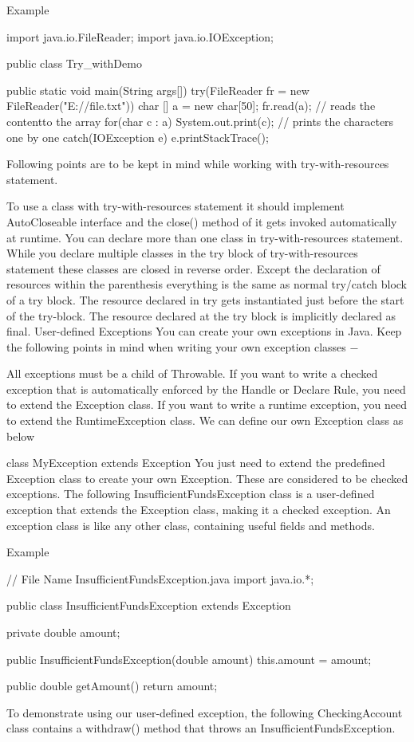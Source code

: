 Example

import java.io.FileReader;
import java.io.IOException;

public class Try_withDemo {

   public static void main(String args[]) {
      try(FileReader fr = new FileReader("E://file.txt")) {
         char [] a = new char[50];
         fr.read(a);   // reads the contentto the array
         for(char c : a)
         System.out.print(c);   // prints the characters one by one
      }catch(IOException e) {
         e.printStackTrace();
      }
   }
}
Following points are to be kept in mind while working with try-with-resources statement.

To use a class with try-with-resources statement it should implement AutoCloseable interface and the close() method of it gets invoked automatically at runtime.
You can declare more than one class in try-with-resources statement.
While you declare multiple classes in the try block of try-with-resources statement these classes are closed in reverse order.
Except the declaration of resources within the parenthesis everything is the same as normal try/catch block of a try block.
The resource declared in try gets instantiated just before the start of the try-block.
The resource declared at the try block is implicitly declared as final.
User-defined Exceptions
You can create your own exceptions in Java. Keep the following points in mind when writing your own exception classes −

All exceptions must be a child of Throwable.
If you want to write a checked exception that is automatically enforced by the Handle or Declare Rule, you need to extend the Exception class.
If you want to write a runtime exception, you need to extend the RuntimeException class.
We can define our own Exception class as below

class MyException extends Exception {
}
You just need to extend the predefined Exception class to create your own Exception. These are considered to be checked exceptions. The following InsufficientFundsException class is a user-defined exception that extends the Exception class, making it a checked exception. An exception class is like any other class, containing useful fields and methods.

Example

// File Name InsufficientFundsException.java
import java.io.*;

public class InsufficientFundsException extends Exception {
   private double amount;

   public InsufficientFundsException(double amount) {
      this.amount = amount;
   }

   public double getAmount() {
      return amount;
   }
}
To demonstrate using our user-defined exception, the following CheckingAccount class contains a withdraw() method that throws an InsufficientFundsException.

